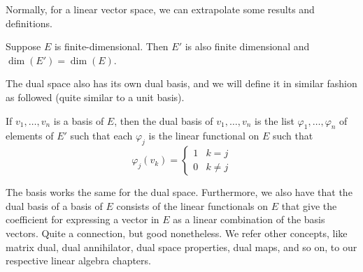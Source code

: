 Normally, for a linear vector space, we can extrapolate some results and definitions.
\begin{theorem}[Dimensionality]
    Suppose $E$ is finite-dimensional. Then $E'$ is also finite dimensional and $\dim{(E')}=\dim{(E)}$.
\end{theorem} 

The dual space also has its own dual basis, and we will define it in similar fashion as followed (quite similar to a unit basis). 
\begin{definition}
    If $v_{1},\dots,v_{n}$ is a basis of $E$, then the dual basis of $v_{1},\dots,v_{n}$ is the list $\varphi_{1},\dots,\varphi_{n}$ of elements of $E'$ such that each $\varphi_{j}$ is the linear functional on $E$ such that 
    \begin{equation}
        \varphi_{j}(v_{k}) = \begin{cases}
            1 & k = j \\
            0 & k \neq j
        \end{cases}
    \end{equation}
\end{definition}

The basis works the same for the dual space. Furthermore, we also have that the dual basis of a basis of $E$ consists of the linear functionals on $E$ that give the coefficient for expressing a vector in $E$ as a linear combination of the basis vectors. Quite a connection, but good nonetheless. We refer other concepts, like matrix dual, dual annihilator, dual space properties, dual maps, and so on, to our respective linear algebra chapters.

